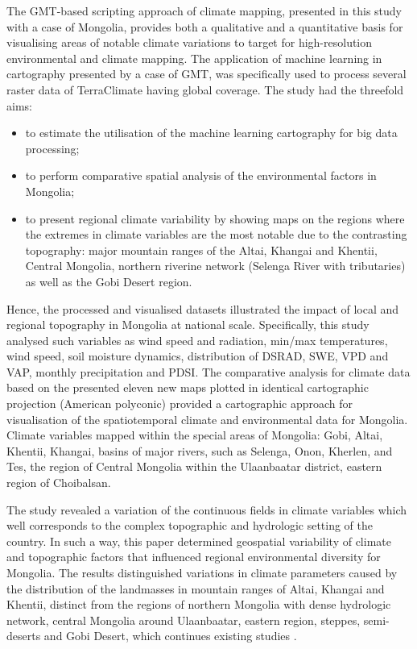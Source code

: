 \documentclass[geosciences,article,submit,pdftex,moreauthors]{Definitions/mdpi}
\begin{document}
The GMT-based scripting approach of climate mapping, presented in this study with a case of Mongolia, provides both a qualitative and a quantitative basis for visualising areas of notable climate variations to target for high-resolution environmental and climate mapping. The application of machine learning in cartography presented by a case of GMT, was specifically used to process several raster data of TerraClimate having global coverage. The study had the threefold aims:     

\begin{itemize}
	\item	to estimate the utilisation of the machine learning cartography for big data processing;
	\item	to perform comparative spatial analysis of the environmental factors in Mongolia;
	\item	to present regional climate variability by showing maps on the regions where the extremes in climate variables are the most notable due to the contrasting topography: major mountain ranges of the Altai, Khangai and Khentii, Central Mongolia, northern riverine network (Selenga River with tributaries) as well as the Gobi Desert region.
\end{itemize}

Hence, the processed and visualised datasets illustrated the impact of local and regional topography in Mongolia at national scale. Specifically, this study analysed such variables as wind speed and radiation,  min/max temperatures, wind speed, soil moisture dynamics, distribution of DSRAD, SWE, VPD and VAP, monthly precipitation and PDSI. The comparative analysis for climate data based on the presented eleven new maps plotted in identical cartographic projection (American polyconic)  provided a cartographic approach for visualisation of the spatiotemporal climate and environmental data for Mongolia. Climate variables mapped within the special areas of Mongolia: Gobi, Altai, Khentii, Khangai, basins of major rivers, such as Selenga, Onon, Kherlen, and Tes, the region of Central Mongolia within the Ulaanbaatar district, eastern region of Choibalsan.

The study revealed a variation of the continuous fields in climate variables which well corresponds to the complex topographic and hydrologic setting of the country. In such a way, this paper determined geospatial variability of climate and topographic factors that influenced regional environmental diversity for Mongolia. The results distinguished variations in climate parameters caused by the distribution of the landmasses in mountain ranges of Altai, Khangai and Khentii, distinct from the regions of northern Mongolia with dense hydrologic network, central Mongolia around Ulaanbaatar, eastern region, steppes, semi-deserts and Gobi Desert, which continues existing studies \cite{Cook,Ulaankhuu}. 
\end{document}

